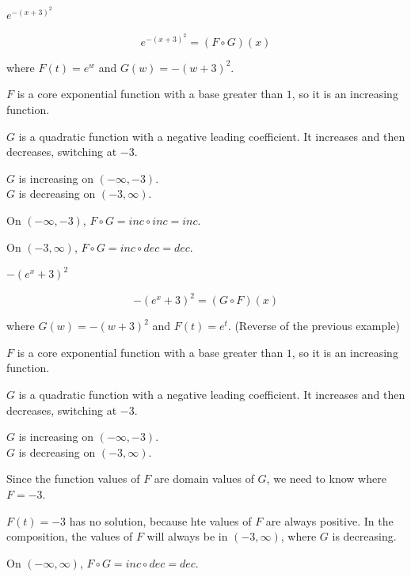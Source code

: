 \documentclass{ximera}
\begin{document}
\begin{example}   $e^{-(x+3)^2}$


\[  e^{-(x+3)^2}   = (F \circ G)(x)\]

where $F(t) = e^w$ and $G(w) = -(w+3)^2$.


$F$ is a core exponential function with a base greater than $1$, so it is an increasing function.


$G$ is a quadratic function with a negative leading coefficient. It increases and then decreases, switching at $-3$.

$G$ is increasing on $(-\infty, -3)$.\\
$G$ is decreasing on $(-3, \infty)$.



On $(-\infty, -3)$, $F \circ G = inc \circ inc = inc$.

On $(-3, \infty)$, $F \circ G = inc \circ dec = dec$.






\end{example}












\begin{example}   $-(e^x+3)^2$


\[  -(e^x+3)^2   = (G \circ F)(x)\]

where $G(w) = -(w+3)^2$ and $F(t) = e^t$.
(Reverse of the previous example)


$F$ is a core exponential function with a base greater than $1$, so it is an increasing function.


$G$ is a quadratic function with a negative leading coefficient. It increases and then decreases, switching at $-3$.

$G$ is increasing on $(-\infty, -3)$.\\
$G$ is decreasing on $(-3, \infty)$.


Since the function values of $F$ are domain values of $G$, we need to know where $F = -3$.

$F(t) = -3$ has no solution, because hte values of $F$ are always positive. In the composition, the values of $F$ will always be in $(-3, \infty)$, where $G$ is decreasing.



On $(-\infty, \infty)$, $F \circ G = inc \circ dec = dec$.








\end{example}
\end{document}
